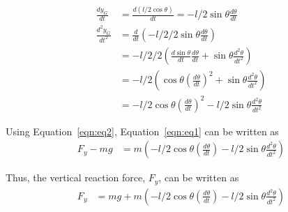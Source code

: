 \documentclass{notes}
\begin{document}
 \begin{align}
   \frac{dy_G}{dt} & = \frac{d(l/2\cos\theta)}{dt} = -l/2\sin\theta\frac{d\theta}{dt} \nonumber\\
   \frac{d^2y_G}{dt^2} & = \frac{d}{dt}\left(-l/2/2 \sin\theta \frac{d\theta}{dt}\right) \nonumber\\
   & = -l/2/2\left(\frac{d\sin\theta}{dt}\frac{d\theta}{dt} + \sin\theta\frac{d^2\theta}{dt^2}\right) \nonumber\\
   & = -l/2\left( \cos\theta \left(\frac{d\theta}{dt}\right)^2 + \sin\theta\frac{d^2\theta}{dt^2}   \right) \nonumber\\
   & = -l/2\cos\theta\left(\frac{d\theta}{dt}\right)^2-l/2\sin\theta\frac{d^2\theta}{dt^2}\label{eqn:eq2}
 \end{align}
 
 Using Equation~\ref{eqn:eq2}, Equation~\ref{eqn:eq1} can be written as 
 \begin{align*}
   F_y - mg & = m\left(-l/2\cos\theta\left(\frac{d\theta}{dt}\right) - l/2\sin\theta\frac{d^2\theta}{dt^2}\right)
 \end{align*}
 
 Thus, the vertical reaction force, $F_y$, can be written as
 \begin{align}
   F_y & = mg + m\left(-l/2\cos\theta\left(\frac{d\theta}{dt}\right) - l/2\sin\theta\frac{d^2\theta}{dt^2}\right)
 \end{align}
\end{document}
